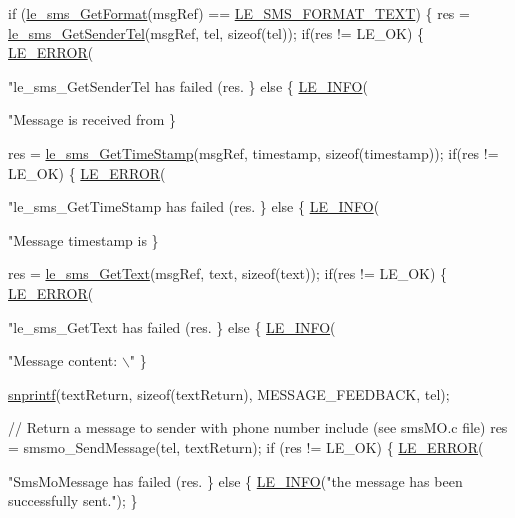 \begin{DoxyCodeInclude}
{{    \textcolor{keywordflow}{if} (\hyperlink{le__sms__interface_8h_a5c2b8ce7043b4732c7b0ede7c5d7118c}{le\_sms\_GetFormat}(msgRef) == \hyperlink{le__sms__interface_8h_a337778c44e63660c44fa2116699296c0a1bb6a0d76a622b1185ee879e1595dff8}{LE\_SMS\_FORMAT\_TEXT})
    \{
        res = \hyperlink{le__sms__interface_8h_aa4651e8dc97aa01df80ed6d9a7a486c6}{le\_sms\_GetSenderTel}(msgRef, tel, \textcolor{keyword}{sizeof}(tel));
        \textcolor{keywordflow}{if}(res != LE\_OK)
        \{
            \hyperlink{le__log_8h_a353590f91b3143a7ba3a416ae5a50c3d}{LE\_ERROR}(\textcolor{stringliteral}{"le\_sms\_GetSenderTel has failed (res.%
        \}
        \textcolor{keywordflow}{else}
        \{
            \hyperlink{le__log_8h_a23e6d206faa64f612045d688cdde5808}{LE\_INFO}(\textcolor{stringliteral}{"Message is received from %
        \}

        res = \hyperlink{le__sms__interface_8h_af018ca1bc2085a48e4b6d4691bef3cc7}{le\_sms\_GetTimeStamp}(msgRef, timestamp, \textcolor{keyword}{sizeof}(timestamp));
        \textcolor{keywordflow}{if}(res != LE\_OK)
        \{
            \hyperlink{le__log_8h_a353590f91b3143a7ba3a416ae5a50c3d}{LE\_ERROR}(\textcolor{stringliteral}{"le\_sms\_GetTimeStamp has failed (res.%
        \}
        \textcolor{keywordflow}{else}
        \{
            \hyperlink{le__log_8h_a23e6d206faa64f612045d688cdde5808}{LE\_INFO}(\textcolor{stringliteral}{"Message timestamp is %
        \}

        res = \hyperlink{le__sms__interface_8h_aebf0c28efce6ec0b9616ffa8ecb80782}{le\_sms\_GetText}(msgRef, text, \textcolor{keyword}{sizeof}(text));
        \textcolor{keywordflow}{if}(res != LE\_OK)
        \{
            \hyperlink{le__log_8h_a353590f91b3143a7ba3a416ae5a50c3d}{LE\_ERROR}(\textcolor{stringliteral}{"le\_sms\_GetText has failed (res.%
        \}
        \textcolor{keywordflow}{else}
        \{
            \hyperlink{le__log_8h_a23e6d206faa64f612045d688cdde5808}{LE\_INFO}(\textcolor{stringliteral}{"Message content: \(\backslash\)"%
        \}

        \hyperlink{app_stop_client_8c_a2b6c4b2a795957a91039524b524be480}{snprintf}(textReturn, \textcolor{keyword}{sizeof}(textReturn), MESSAGE\_FEEDBACK, tel);

        \textcolor{comment}{// Return a message to sender with phone number include (see smsMO.c file)}
        res = smsmo\_SendMessage(tel, textReturn);
        \textcolor{keywordflow}{if} (res != LE\_OK)
        \{
            \hyperlink{le__log_8h_a353590f91b3143a7ba3a416ae5a50c3d}{LE\_ERROR}(\textcolor{stringliteral}{"SmsMoMessage has failed (res.%
        \}
        \textcolor{keywordflow}{else}
        \{
            \hyperlink{le__log_8h_a23e6d206faa64f612045d688cdde5808}{LE\_INFO}(\textcolor{stringliteral}{"the message has been successfully sent."});
        \}

}}}}}}}}}
\end{DoxyCodeInclude}
